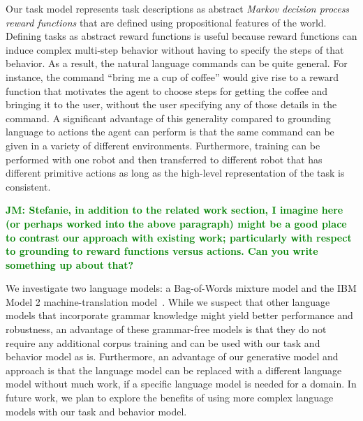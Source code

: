 \documentclass[conference]{IEEEtran}
\newcommand{\jmnote}[1]{\textcolor{Green}{\textbf{JM: #1}}}
\begin{document}
Our task model represents task descriptions as abstract \emph{Markov decision process reward functions} that are defined using propositional features of the world. Defining tasks as abstract reward functions is useful because reward functions can induce complex multi-step behavior without having to specify the steps of that behavior. As a result, the natural language commands can be quite general. For instance, the command
``bring me a cup of coffee'' would give rise to a reward function that motivates the agent to choose steps for getting the coffee and bringing it to the user, without the user specifying any of those details in the command. A significant advantage of this generality compared to grounding language to actions the agent can perform is that the same command can be given in a variety of different environments. Furthermore, training can be performed with one robot and then transferred to different robot that has different primitive actions as long as the high-level representation of the task is consistent.

\jmnote{Stefanie, in addition to the related work section, I imagine here (or perhaps worked into the above paragraph) might be a good place to contrast our approach with existing work; particularly with respect to grounding to reward functions versus actions. Can you write something up about that?}

We investigate two language models: a Bag-of-Words mixture model and the IBM Model 2 machine-translation model~\cite{brown90,brown93}. While we suspect that other language models that incorporate grammar knowledge might yield better performance and robustness, an advantage of these grammar-free models is that they do not require any additional corpus training and can be used with our task and behavior model as is. Furthermore, an advantage of our generative model and approach is that the language model can be replaced with a different language model without much work, if a specific language model is needed for a domain. In future work, we plan to explore the benefits of using more complex language models with our task and behavior model.
\end{document}
